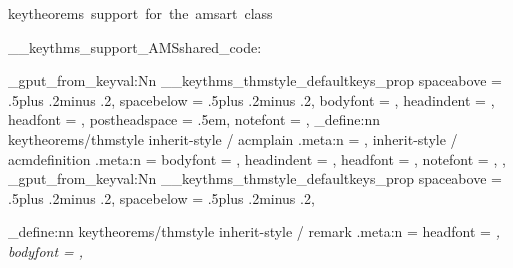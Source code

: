   {keytheorems~support~for~the~amsart~class}

\__keythms_support_AMSshared_code:

  { %
    \prop_gput_from_keyval:Nn \g__keythms_thmstyle_defaultkeys_prop
      {
        spaceabove    = .5\baselineskip plus .2\baselineskip minus .2\baselineskip,
        spacebelow    = .5\baselineskip plus .2\baselineskip minus .2\baselineskip,
        bodyfont      = \@acmplainbodyfont,
        headindent    = \@acmplainindent,
        headfont      = \@acmplainheadfont,
        postheadspace = .5em,
        notefont      = \@acmplainnotefont,
      }
    \keys_define:nn { keytheorems/thmstyle }
      {
        inherit-style / acmplain      .meta:n = {},
        inherit-style / acmdefinition .meta:n =
          {
            bodyfont   = \@acmdefinitionbodyfont,
            headindent = \@acmdefinitionindent,
            headfont   = \@acmdefinitionheadfont,
            notefont   = \@acmdefinitionnotefont,
          },
      }
  }
  {
    \prop_gput_from_keyval:Nn \g__keythms_thmstyle_defaultkeys_prop
      {
        spaceabove    = .5\baselineskip plus .2\baselineskip minus .2\baselineskip,
        spacebelow    = .5\baselineskip plus .2\baselineskip minus .2\baselineskip,
      }
  }

\keys_define:nn { keytheorems/thmstyle }
  {
    inherit-style / remark .meta:n =
      {
        headfont = \itshape,
        bodyfont = \normalfont,
      }
  }